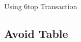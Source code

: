 \begin{withoutheadline}
\begin{frame}{Using 6top Transaction}
\begin{figure}[p]
 
\end{figure}

\end{frame}
\end{withoutheadline}

\subsection{Avoid Table}


